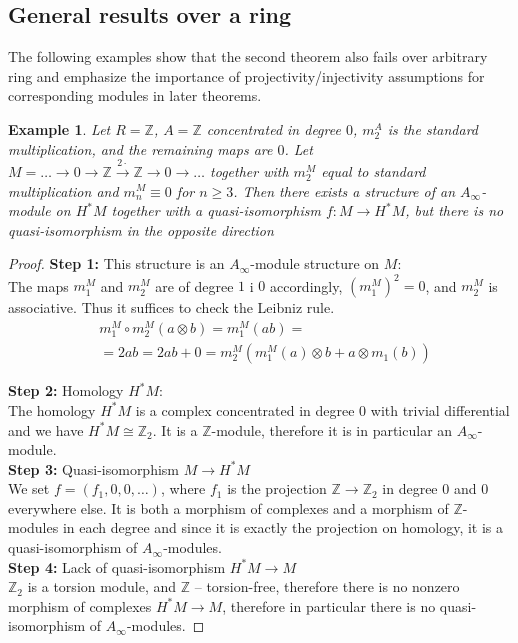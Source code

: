 \documentclass[a4paper, 12pt, openany, fleqn]{amsart}
\newtheorem{exmp}[theorem]{Example}
\begin{document}
\subsection{General results over a ring}
The following examples show that the second theorem also fails over arbitrary ring and emphasize the importance of projectivity/injectivity assumptions for corresponding modules in later theorems.
\begin{exmp}
Let $R=\mathbb{Z}$, $A = \mathbb{Z}$ concentrated in degree $0$, $m_2^A$ is the standard multiplication, and the remaining maps are $0$. Let $M = \dots\rightarrow 0 \rightarrow \mathbb{Z} \xrightarrow{2\cdot} \mathbb{Z}\rightarrow 0 \rightarrow \dots$ together with $m_2^M$ equal to standard multiplication and $m_n^M \equiv 0$ for $n\geq 3$. Then there exists a structure of an $A_\infty$-module on $H^*M$ together with a quasi-isomorphism $f:M\longrightarrow H^*M$, but there is no quasi-isomorphism in the opposite direction
\end{exmp}
\begin{proof}
    \textbf{Step 1:} This structure is an $A_\infty$-module structure on $M$:\\
    The maps $m_1^M$ and $m_2^M$ are of degree $1$ i $0$ accordingly, $(m_1^M)^2=0$, and $m_2^M$ is associative. Thus it suffices to check the Leibniz rule.
    \begin{align*}
        &m_1^M \circ m_2^M(a\otimes b) = m_1^M(ab)=\\ &= 2ab = 2ab + 0= m_2^M(m_1^M(a)\otimes b + a\otimes m_1(b))
    \end{align*}

    \smallskip
    \textbf{Step 2:} Homology $H^*M$:\\
    The homology $H^*M$ is a complex concentrated in degree $0$ with trivial differential and we have $H^*M\cong\mathbb{Z}_2$. It is a $\mathbb{Z}$-module, therefore it is in particular an $A_\infty$-module.\\

    \smallskip
    \textbf{Step 3:} Quasi-isomorphism $M\longrightarrow H^*M$\\
    We set $f = (f_1,0,0,\dots)$, where $f_1$ is the projection $\mathbb{Z}\longrightarrow\mathbb{Z}_2$ in degree $0$ and $0$ everywhere else. It is both a morphism of complexes and a morphism of $\mathbb{Z}$-modules in each degree and since it is exactly the projection on homology, it is a quasi-isomorphism of $A_\infty$-modules.\\

    \smallskip
    \textbf{Step 4:} Lack of quasi-isomorphism $H^*M \longrightarrow M$\\
    $\mathbb{Z}_2$ is a torsion module, and $\mathbb{Z}$ -- torsion-free, therefore there is no nonzero morphism of complexes $H^*M \longrightarrow M$, therefore in particular there is no quasi-isomorphism of $A_\infty$-modules.
\end{proof}
\end{document}
